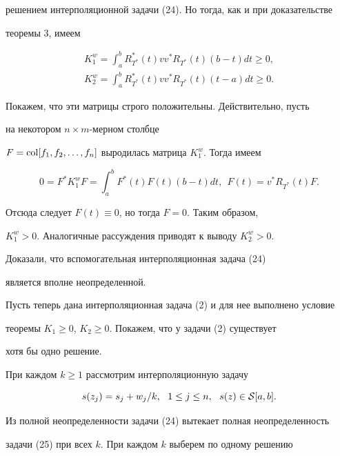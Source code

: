 \begin{pf}
решением интерполяционной задачи (24). Но тогда, как и при доказательстве


теоремы 3, имеем


\begin{gather*}


K_1^w=\int_a^b R_{T^*}^*(t)vv^{*}R_{T^*}(t)(b-t)dt \geq 0, \\


%


K_2^w=\int_a^b R_{T^*}^*(t)vv^{*}R_{T^*}(t)(t-a)dt \geq 0.


\end{gather*}


Покажем, что эти матрицы строго положительны. Действительно, пусть


на некотором $n\times m$-мерном столбце


$F=\operatorname{col} [f_1,f_2,\dotsc,f_n]$ выродилась матрица $K_1^w$. Тогда имеем


$$


0=F^*K_1^wF=\int_a^b F^*(t)F(t)(b-t)dt,\ \ F(t)=v^{*}R_{T^*}(t)F.


$$


Отсюда следует $F(t)\equiv 0$, но тогда $F=0.$ Таким образом,


$K_1^w>0$. Аналогичные рассуждения приводят к выводу $K_2^w>0$.


Доказали, что вспомогательная интерполяционная задача (24)


является вполне неопределенной.





Пусть теперь дана интерполяционная задача (2) и для нее выполнено условие


теоремы $K_1{\geq} 0$, $K_2 \geq 0$. Покажем, что у задачи (2) существует


хотя бы одно решение.





При каждом $k\geq 1$ рассмотрим интерполяционную задачу


\begin{equation}


s(z_j)=s_j+w_j/k, \ \ 1 \leq j \leq n,


\ \ s(z) \in {\cal S}[a,b].


\end{equation}


Из полной неопределенности задачи (24) вытекает полная неопределенность


задачи (25) при всех $k$. При каждом $k$ выберем по одному решению



\end{pf}
